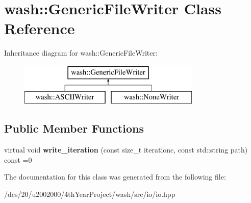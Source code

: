 \hypertarget{classwash_1_1GenericFileWriter}{}\section{wash\+:\+:Generic\+File\+Writer Class Reference}
\label{classwash_1_1GenericFileWriter}
Inheritance diagram for wash\+:\+:Generic\+File\+Writer\+:\begin{figure}[H]
\begin{center}
\leavevmode
\includegraphics[height=2.000000cm]{classwash_1_1GenericFileWriter}
\end{center}
\end{figure}
\subsection*{Public Member Functions}
\begin{DoxyCompactItemize}
\item 
\mbox{\label{classwash_1_1GenericFileWriter_aae09bd9ec13abb5c3935062e79338fef}} 
virtual void {\bfseries write\+\_\+iteration} (const size\+\_\+t iterationc, const std\+::string path) const =0
\end{DoxyCompactItemize}


The documentation for this class was generated from the following file\+:\begin{DoxyCompactItemize}
\item 
/dcs/20/u2002000/4th\+Year\+Project/wash/src/io/io.\+hpp\end{DoxyCompactItemize}
